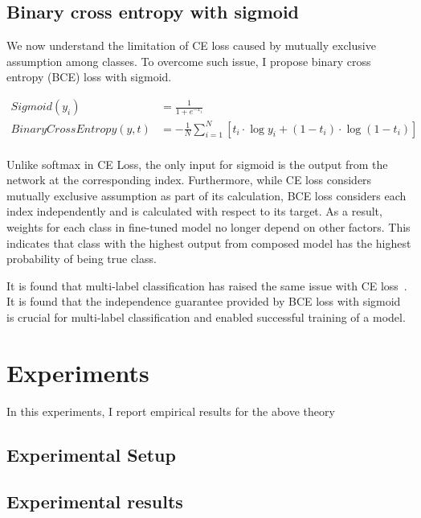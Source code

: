 \documentclass{article}
\begin{document}
\subsection{Binary cross entropy with sigmoid}

We now understand the limitation of CE loss caused by mutually exclusive assumption among classes. To overcome such issue, I propose binary cross entropy (BCE) loss with sigmoid.

\begin{align*}
Sigmoid(y_i) &= \frac{1}{1 + e^{-x_i}} \\
BinaryCrossEntropy(y, t) & = -\frac{1}{N}\sum_{i=1}^N \left[ t_i \cdot \log y_i + (1 - t_i) \cdot \log (1 - t_i) \right] \\
\end{align*}

Unlike softmax in CE Loss, the only input for sigmoid is the output from the network at the corresponding index. Furthermore, while CE loss considers mutually exclusive assumption as part of its calculation, BCE loss considers each index independently and is calculated with respect to its target. As a result, weights for each class in fine-tuned model no longer depend on other factors. This indicates that class with the highest output from composed model has the highest probability of being true class.

It is found that multi-label classification has raised the same issue with CE loss~\cite{liu2017deep}. It is found that the independence guarantee provided by BCE loss with sigmoid is crucial for multi-label classification and enabled successful training of a model.

\section{Experiments}



In this experiments, I report empirical results for the above theory

\subsection{Experimental Setup}




\subsection{Experimental results}
\end{document}
